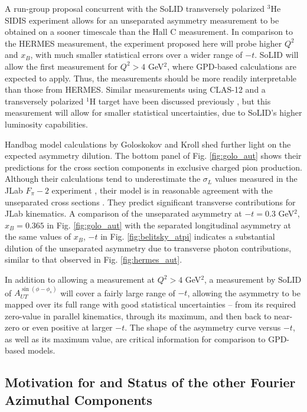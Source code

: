 A run-group proposal concurrent with the SoLID transversely polarized $^3$He
SIDIS experiment allows for an unseparated asymmetry measurement to be obtained
on a sooner timescale than the Hall C measurement.  In comparison to the HERMES
measurement, the experiment proposed here will probe higher $Q^2$ and $x_B$,
with much smaller statistical errors over a wider range of $-t$.
SoLID will allow the first measurement for $Q^2>4$ GeV$^2$, where GPD-based
calculations are expected to apply.  Thus, the measurements should be more
readily interpretable than those from HERMES.  Similar measurements using
CLAS-12 and a transversely polarized $^1$H target have been discussed
previously \cite{clas}, but this measurement will allow for smaller statistical
uncertainties, due to SoLID's higher luminosity capabilities.

Handbag model calculations by Goloskokov and Kroll \cite{GoPC} shed further
light on the expected asymmetry dilution.  The bottom panel of
Fig. \ref{fig:golo_aut} shows their predictions for the cross section
components in exclusive charged pion production.  Although their calculations
tend to underestimate the $\sigma_L$ values measured in the JLab $F_{\pi}-2$
experiment \cite{Fpi2}, their model is in reasonable agreement with the
unseparated cross sections \cite{Go10}.  They predict significant transverse
contributions for JLab kinematics.  A comparison of the unseparated asymmetry
at $-t=0.3$ GeV$^2$, $x_B=0.365$ in Fig. \ref{fig:golo_aut} with the separated
longitudinal asymmetry at the same values of $x_B$, $-t$ in
Fig. \ref{fig:belitsky_atpi} indicates a substantial dilution of the
unseparated asymmetry due to transverse photon contributions, similar to that
observed in Fig. \ref{fig:hermes_aut}.

In addition to allowing a measurement at $Q^2>4$ GeV$^2$, a measurement by
SoLID of $A_{UT}^{\sin(\phi-\phi_s)}$ will cover a fairly large range of $-t$,
allowing the asymmetry to be mapped over its full range with good statistical
uncertainties -- from its required zero-value in parallel kinematics, through
its maximum, and then back to near-zero or even positive at larger $-t$.  
The shape of the asymmetry curve versus
$-t$, as well as its maximum value, are critical information for comparison to
GPD-based models.

\subsection{Motivation for and Status of the other Fourier Azimuthal Components
\label{sec:sinphiS}}

